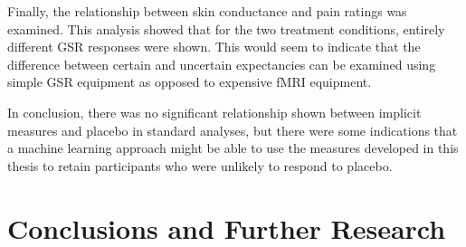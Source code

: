 Finally, the relationship between skin conductance and pain ratings was examined. This analysis showed that for the two treatment conditions, entirely different GSR responses were shown. This would seem to indicate that the difference between certain and uncertain expectancies can be examined using simple GSR equipment as opposed to expensive fMRI equipment. 

In conclusion, there was no significant relationship shown between implicit measures and placebo in standard analyses, but there were some indications that a machine learning approach might be able to use the measures developed in this thesis to retain participants who were unlikely to respond to placebo. 

\section{Conclusions and Further Research}

